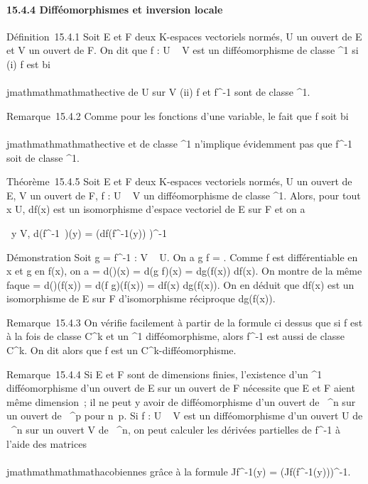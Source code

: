 \paragraph{15.4.4 Difféomorphismes et inversion locale}

Définition~15.4.1 Soit E et F deux K-espaces vectoriels normés, U un
ouvert de E et V un ouvert de F. On dit que f : U \rightarrow~ V est un
difféomorphisme de classe ^1 si (i) f est bi\\\\jmathmathmathmathective de U sur
V (ii) f et f^-1 sont de classe ^1.

Remarque~15.4.2 Comme pour les fonctions d'une variable, le fait que f
soit bi\\\\jmathmathmathmathective et de classe ^1 n'implique évidemment pas que
f^-1 soit de classe ^1.

Théorème~15.4.5 Soit E et F deux K-espaces vectoriels normés, U un
ouvert de E, V un ouvert de F, f : U \rightarrow~ V un difféomorphisme de classe
^1. Alors, pour tout x \in U, df(x) est un isomorphisme
d'espace vectoriel de E sur F et on a

\forall~y \in V, d(f^-1~)(y) =
\left (df(f^-1(y))\right
)^-1

Démonstration Soit g = f^-1 : V \rightarrow~ U. On a g \cdot f =
\mathrmIdU. Comme f est différentiable en x
et g en f(x), on a \mathrmIdE =
d(\mathrmIdU)(x) = d(g \cdot f)(x) = dg(f(x)) \cdot
df(x). On montre de la même fa\ccon que
\mathrmIdF =
d(\mathrmIdV )(f(x)) = d(f \cdot g)(f(x)) =
df(x) \cdot dg(f(x)). On en déduit que df(x) est un isomorphisme de E sur F
d'isomorphisme réciproque dg(f(x)).

Remarque~15.4.3 On vérifie facilement à partir de la formule ci dessus
que si f est à la fois de classe C^k et un ^1
difféomorphisme, alors f^-1 est aussi de classe
C^k. On dit alors que f est un
C^k-difféomorphisme.

Remarque~15.4.4 Si E et F sont de dimensions finies, l'existence d'un
^1 difféomorphisme d'un ouvert de E sur un ouvert de F
nécessite que E et F aient même dimension~; il ne peut y avoir de
difféomorphisme d'un ouvert de ~^n sur un ouvert de
~^p pour n\neq~p. Si f : U \rightarrow~ V est un
difféomorphisme d'un ouvert U de ~^n sur un ouvert V de
~^n, on peut calculer les dérivées partielles de
f^-1 à l'aide des matrices \\\\jmathmathmathmathacobiennes grâce à la formule
Jf^-1(y) = \left
(Jf(f^-1(y))\right )^-1.

